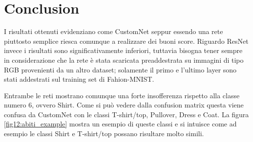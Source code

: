 \section{Conclusion} \label{sec:conclusions}
I risultati ottenuti evidenziano come CustomNet seppur essendo una rete piuttosto semplice riesca comunque a realizzare dei buoni score. Riguardo ResNet invece i risultati sono significativamente inferiori, tuttavia bisogna tener sempre in considerazione che la rete è stata scaricata preaddestrata su immagini di tipo RGB provenienti da un altro dataset; solamente il primo e l'ultimo layer sono stati addestrati sul training set di Fahion-MNIST.\par
Entrambe le reti mostrano comunque una forte insofferenza rispetto alla classe numero 6, ovvero Shirt. Come si può vedere dalla confusion matrix questa viene confusa da CustomNet con le classi T-shirt/top, Pullover, Dress e Coat. La figura \ref{fig12:abiti_example} mostra un esempio di queste classi e si intuisce come ad esempio le classi Shirt e T-shirt/top possano risultare molto simili.

